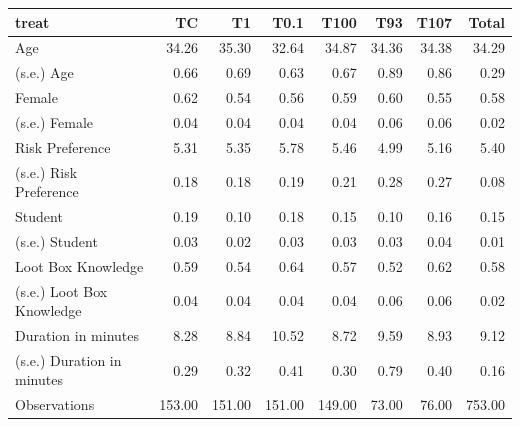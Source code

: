 \begin{tabular}{lrrrrrrr}
\toprule
treat & TC & T1 & T0.1 & T100 & T93 & T107 & Total \\
\midrule
Age & 34.26 & 35.30 & 32.64 & 34.87 & 34.36 & 34.38 & 34.29 \\
  (s.e.) Age & 0.66 & 0.69 & 0.63 & 0.67 & 0.89 & 0.86 & 0.29 \\
Female & 0.62 & 0.54 & 0.56 & 0.59 & 0.60 & 0.55 & 0.58 \\
  (s.e.) Female & 0.04 & 0.04 & 0.04 & 0.04 & 0.06 & 0.06 & 0.02 \\
Risk Preference & 5.31 & 5.35 & 5.78 & 5.46 & 4.99 & 5.16 & 5.40 \\
  (s.e.) Risk Preference & 0.18 & 0.18 & 0.19 & 0.21 & 0.28 & 0.27 & 0.08 \\
Student & 0.19 & 0.10 & 0.18 & 0.15 & 0.10 & 0.16 & 0.15 \\
  (s.e.) Student & 0.03 & 0.02 & 0.03 & 0.03 & 0.03 & 0.04 & 0.01 \\
Loot Box Knowledge & 0.59 & 0.54 & 0.64 & 0.57 & 0.52 & 0.62 & 0.58 \\
  (s.e.) Loot Box Knowledge & 0.04 & 0.04 & 0.04 & 0.04 & 0.06 & 0.06 & 0.02 \\
Duration in minutes & 8.28 & 8.84 & 10.52 & 8.72 & 9.59 & 8.93 & 9.12 \\
  (s.e.) Duration in minutes & 0.29 & 0.32 & 0.41 & 0.30 & 0.79 & 0.40 & 0.16 \\
Observations & 153.00 & 151.00 & 151.00 & 149.00 & 73.00 & 76.00 & 753.00 \\
\bottomrule
\end{tabular}
